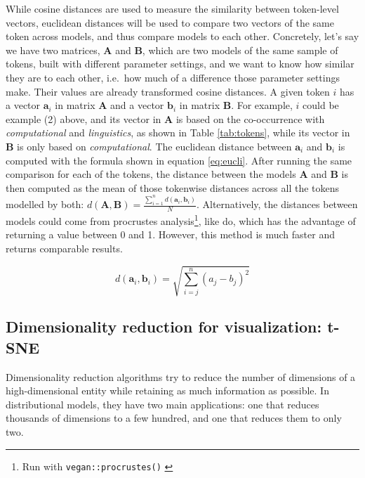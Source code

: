 \documentclass[
]{book}
\begin{document}
While cosine distances are used to measure the similarity between token-level vectors, euclidean distances will be used to compare two vectors of the same token across models, and thus compare models to each other. Concretely, let's say we have two matrices, \(\mathbf{A}\) and \(\mathbf{B}\), which are two models of the same sample of tokens, built with different parameter settings, and we want to know how similar they are to each other, i.e.~how much of a difference those parameter settings make. Their values are already transformed cosine distances. A given token \(i\) has a vector \(\mathbf{a}_i\) in matrix \(\mathbf{A}\) and a vector \(\mathbf{b}_i\) in matrix \(\mathbf{B}\). For example, \(i\) could be example (2) above, and its vector in \(\mathbf{A}\) is based on the co-occurrence with \emph{computational} and \emph{linguistics}, as shown in Table \ref{tab:tokens}, while its vector in \(\mathbf{B}\) is only based on \emph{computational}. The euclidean distance between \(\mathbf{a}_i\) and \(\mathbf{b}_i\) is computed with the formula shown in equation \eqref{eq:eucli}. After running the same comparison for each of the tokens, the distance between the models \(\mathbf{A}\) and \(\mathbf{B}\) is then computed as the mean of those tokenwise distances across all the tokens modelled by both: \(d(\mathbf{A},\mathbf{B}) = \frac{\sum_{i=1}^nd(\mathbf{a}_i, \mathbf{b}_i)}{N}\). Alternatively, the distances between models could come from procrustes analysis\footnote{Run with \texttt{vegan::procrustes()} \autocite{R-vegan}}, like \textcite{wielfaert.etal_2019} do, which has the advantage of returning a value between 0 and 1. However, this method is much faster and returns comparable results.

\begin{equation}
    d(\mathbf{a}_i, \mathbf{b}_i) = \sqrt{\sum\limits_{i=j}^n(a_j-b_j)^2}
    \label{eq:eucli}
\end{equation}

\hypertarget{dim-reduction}{%
\subsection{Dimensionality reduction for visualization: t-SNE}\label{dim-reduction}}

Dimensionality reduction algorithms try to reduce the number of dimensions of a high-dimensional entity while retaining as much information as possible. In distributional models, they have two main applications: one that reduces thousands of dimensions to a few hundred, and one that reduces them to only two.
\end{document}
